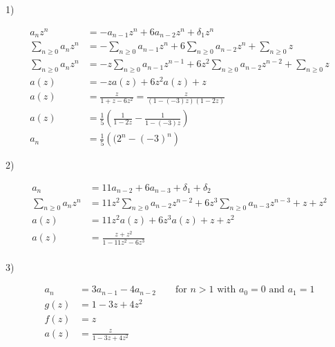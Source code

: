 \documentclass[12pt]{article}
\begin{document}
1)

\begin{equation}
\begin{aligned}
a_nz^n & = -a_{n - 1}z^n + 6a_{n - 2}z^n + \delta_1z^n \\
\sum_{n \geq 0} a_nz^n & = -\sum_{n \geq 0}a_{n-1}z^n + 6\sum_{n \geq 0}a_{n - 2}z^n + \sum_{n \geq 0}z\\
\sum_{n \geq 0} a_nz^n & = -z \sum_{n \geq 0}a_{n-1}z^{n-1} + 6z^2\sum_{n \geq 0}a_{n-2}z^{n-2} + \sum_{n \geq 0}z \\
a(z) & = -za(z) + 6z^2a(z) + z \\
a(z) & = \frac{z}{1 + z - 6z^2} = \frac{z}{(1 - (-3)z)(1 - 2z)} \\
a(z) & = \frac{1}{5}\left(\frac{1}{1 - 2z} - \frac{1}{1 - (-3)z} \right) \\
a_n & = \frac{1}{5}\left(({2^n} - (-3)^n\right) \nonumber
\end{aligned}
\end{equation}

2)

\begin{equation}
\begin{aligned}
a_n & = 11a_{n - 2} + 6a_{n - 3} + \delta_1 + \delta_2 \\
\sum_{n \geq 0} a_nz^n & = 11z^2\sum_{n \geq 0}a_{n - 2}z^{n - 2} + 6z^3\sum_{n \geq 0} a_{n - 3}z^{n - 3} + z + z^2 \\
a(z) & = 11z^2a(z) + 6z^3a(z) + z + z^2 \\
a(z) & = \frac{z + z^2}{1 - 11z^2 - 6z^3} \\
\nonumber
\end{aligned}
\end{equation}

3)

\begin{equation}
\begin{aligned}
a_n & = 3a_{n - 1} - 4a_{n - 2} \qquad \text{for ${n > 1}$ with ${a_0 = 0}$ and ${a_1 = 1}$} \\
g(z) & = 1 - 3z + 4z^2 \\
f(z) & = z \\
a(z) & = \frac{z}{1 - 3z + 4z^2} \\
\nonumber
\end{aligned}
\end{equation}
\end{document}
